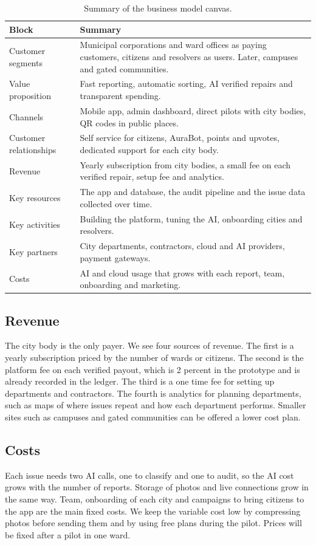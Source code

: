 \documentclass[conference,a4paper]{IEEEtran}
\begin{document}
\begin{table}[!t]\centering\footnotesize
\caption{Summary of the business model canvas.}\label{tab:bmc}
\begin{tabular}{L{3.4cm}L{13.4cm}}\toprule
\textbf{Block} & \textbf{Summary}\\\midrule
Customer segments & Municipal corporations and ward offices as paying customers, citizens and resolvers as users. Later, campuses and gated communities.\\
Value proposition & Fast reporting, automatic sorting, AI verified repairs and transparent spending.\\
Channels & Mobile app, admin dashboard, direct pilots with city bodies, QR codes in public places.\\
Customer relationships & Self service for citizens, AuraBot, points and upvotes, dedicated support for each city body.\\
Revenue & Yearly subscription from city bodies, a small fee on each verified repair, setup fee and analytics.\\
Key resources & The app and database, the audit pipeline and the issue data collected over time.\\
Key activities & Building the platform, tuning the AI, onboarding cities and resolvers.\\
Key partners & City departments, contractors, cloud and AI providers, payment gateways.\\
Costs & AI and cloud usage that grows with each report, team, onboarding and marketing.\\\bottomrule
\end{tabular}\end{table}

\subsection{Revenue}
The city body is the only payer. We see four sources of revenue. The first is a yearly subscription priced by the number of wards or citizens. The second is the platform fee on each verified payout, which is 2 percent in the prototype and is already recorded in the ledger. The third is a one time fee for setting up departments and contractors. The fourth is analytics for planning departments, such as maps of where issues repeat and how each department performs. Smaller sites such as campuses and gated communities can be offered a lower cost plan.

\subsection{Costs}
Each issue needs two AI calls, one to classify and one to audit, so the AI cost grows with the number of reports. Storage of photos and live connections grow in the same way. Team, onboarding of each city and campaigns to bring citizens to the app are the main fixed costs. We keep the variable cost low by compressing photos before sending them and by using free plans during the pilot. Prices will be fixed after a pilot in one ward.
\end{document}
